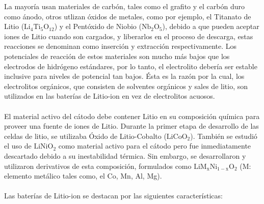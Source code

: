 \documentclass[10pt,a4paper]{article}
\begin{document}
    La mayoría usan materiales de carbón, tales como el grafito y el carbón 
    duro como ánodo, otros utlizan óxidos de metales, como por ejemplo, el 
    Titanato de Litio ($\mathrm{Li_4Ti_5O_{12}}$) y el Pentóxido de Niobio 
    ($\mathrm{Nb_2O_5}$), debido a que pueden aceptar iones de Litio cuando son 
    cargados, y liberarlos en el proceso de descarga, estas reacciones se 
    denominan como inserción y extracción respectivamente. Los potenciales de 
    reacción de estos materiales son mucho más bajos que los electrodos de 
    hidrógeno estándares, por lo tanto, el electrolito debería ser estable 
    inclusive para niveles de potencial tan bajos. Ésta es la razón por la 
    cual, los electrolitos orgánicos, que consisten de solventes orgánicos y 
    sales de litio, son utilizados en las baterías de Litio-ion en vez de 
    electrolitos acuosos.\\
	\\
	El material activo del cátodo debe contener Litio en su composición química 
    para proveer una fuente de iones de Litio. Durante la primer etapa de 
    desarrollo de las celdas de litio, se utilizaba Óxido de Litio-Cobalto 
    ($\mathrm{LiCoO_2}$). También se estudió el uso de $\mathrm{LiNiO_2}$ como 
    material activo para el cátodo pero fue inmediatamente descartado debido a 
    su inestabilidad térmica. Sin embargo, se desarrollaron y utilizaron 
    derivativos de esta composición, formulados como 
    $\mathrm{LiM_xNi_{1-x}O_2}$ (M: elemento metálico tales como, el Co, Mn, 
    Al, Mg).\\
	\\
	Las baterías de Litio-ion se destacan por las siguientes características:
\end{document}
